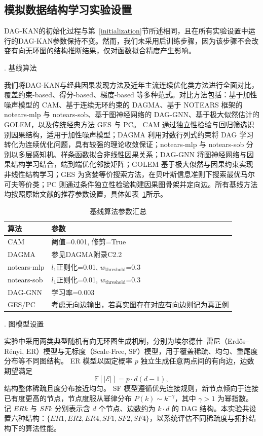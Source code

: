 \subsection{模拟数据结构学习实验设置}

DAG-KAN的初始化过程与第~\ref{initialization}节所述相同，且在所有实验设置中运行的DAG-KAN参数保持不变。然而，我们未采用后训练步骤，因为该步骤不会改变有向无环图的结构推断结果，仅对函数拟合精度产生影响。

{. 基线算法}

我们将DAG-KAN与经典因果发现方法及近年主流连续优化类方法进行全面对比，覆盖约束-based、得分-based、梯度-based 等多种范式。对比方法包括：基于加性噪声模型的 CAM、基于连续无环约束的 DAGMA、基于 NOTEARS 框架的 notears-mlp 与 notears-sob、基于图神经网络的 DAG-GNN、基于极大似然估计的 GOLEM，以及传统经典方法 GES 与 PC。
CAM 通过独立性检验与回归筛选识别因果结构，适用于加性噪声模型；DAGMA 利用对数行列式约束将 DAG 学习转化为连续优化问题，具有较强的理论收敛保证；notears-mlp 与 notears-sob 分别以多层感知机、样条函数拟合非线性因果关系；DAG-GNN 将图神经网络与因果结构学习结合，端到端优化邻接矩阵；GOLEM 基于极大似然与因果约束实现非线性结构学习；GES 为贪婪等价搜索方法，在贝叶斯信息准则下搜索最优马尔可夫等价类；PC 则通过条件独立性检验构建因果图骨架并定向边。所有基线方法均按照原始文献的推荐参数设置，具体如表~\ref{tab:baseline_params}所示。

\begin{table}[!htbp]
	\caption{基线算法参数汇总}
	\label{tab:baseline_params}
	\begin{tabularx}{\linewidth}{lX}
		\toprule[1.5pt]
		\textbf{算法} & \textbf{参数} \\
		\midrule
		CAM        & 阈值=0.001, 修剪=True \\
		DAGMA      & 参见DAGMA附录C2.2 \\
		notears-mlp& $l_1$正则化=0.01, $w_\mathrm{threshold}$=0.3 \\
		notears-sob& $l_1$正则化=0.01, $w_\mathrm{threshold}$=0.3 \\
		DAG-GNN    & 学习率=0.003 \\
		GES/PC     & 考虑无向边输出，若真实图存在对应有向边则记为真正例 \\
		\bottomrule[1.5pt]
	\end{tabularx}
\end{table}

{. 图模型设置}

实验中采用两类典型随机有向无环图生成机制，分别为埃尔德什–雷尼（Erdős–Rényi, ER）模型与无标度（Scale-Free, SF）模型，用于覆盖稀疏、均匀、重尾度分布等不同图结构。
ER 模型以固定概率 \(p\) 独立生成任意两点间的有向边，边数期望满足
\[
\mathbb{E}[|\mathcal{E}|] = p \cdot d (d-1),
\]
结构整体稀疏且度分布接近均匀。
SF 模型遵循优先连接规则，新节点倾向于连接已有度更高的节点，节点度服从幂律分布 \(P(k) \sim k^{-\gamma}\)，其中 \(\gamma>1\) 为幂指数。
记 \(ERk\) 与 \(SFk\) 分别表示含 \(d\) 个节点、边数约为 \(k \cdot d\) 的 DAG 结构。本实验共设置六种结构：\(\{ER1, ER2, ER4, SF1, SF2, SF4\}\)，以系统评估不同稀疏度与拓扑结构下的算法性能。

